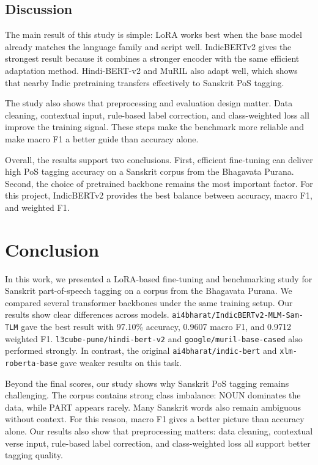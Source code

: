 \documentclass[conference]{IEEEtran}
\begin{document}
\subsection{Discussion}
The main result of this study is simple: LoRA works best when the base model already matches the language family and script well. IndicBERTv2 gives the strongest result because it combines a stronger encoder with the same efficient adaptation method. Hindi-BERT-v2 and MuRIL also adapt well, which shows that nearby Indic pretraining transfers effectively to Sanskrit PoS tagging.

The study also shows that preprocessing and evaluation design matter. Data cleaning, contextual input, rule-based label correction, and class-weighted loss all improve the training signal. These steps make the benchmark more reliable and make macro F1 a better guide than accuracy alone.

Overall, the results support two conclusions. First, efficient fine-tuning can deliver high PoS tagging accuracy on a Sanskrit corpus from the Bhagavata Purana. Second, the choice of pretrained backbone remains the most important factor. For this project, IndicBERTv2 provides the best balance between accuracy, macro F1, and weighted F1.

\section{Conclusion}
In this work, we presented a LoRA-based fine-tuning and benchmarking study for Sanskrit part-of-speech tagging on a corpus from the Bhagavata Purana. We compared several transformer backbones under the same training setup. Our results show clear differences across models. \texttt{ai4bharat/IndicBERTv2-MLM-Sam-TLM} gave the best result with 97.10\% accuracy, 0.9607 macro F1, and 0.9712 weighted F1. \texttt{l3cube-pune/hindi-bert-v2} and \texttt{google/muril-base-cased} also performed strongly. In contrast, the original \texttt{ai4bharat/indic-bert} and \texttt{xlm-roberta-base} gave weaker results on this task.

Beyond the final scores, our study shows why Sanskrit PoS tagging remains challenging. The corpus contains strong class imbalance: NOUN dominates the data, while PART appears rarely. Many Sanskrit words also remain ambiguous without context. For this reason, macro F1 gives a better picture than accuracy alone. Our results also show that preprocessing matters: data cleaning, contextual verse input, rule-based label correction, and class-weighted loss all support better tagging quality.
\end{document}
